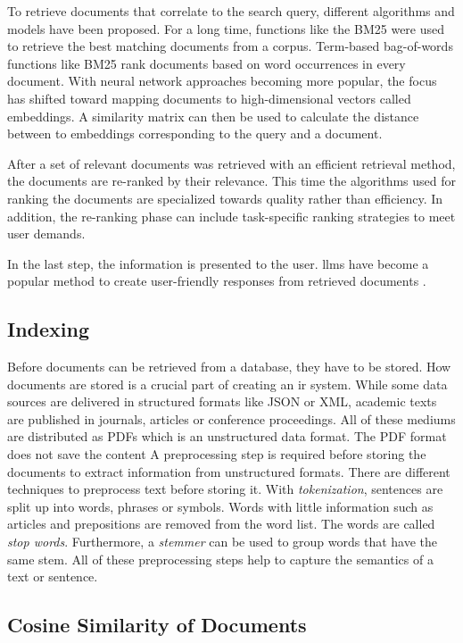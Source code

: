 \documentclass[../main.tex]{subfiles}
\begin{document}
To retrieve documents that correlate to the search query,
different algorithms and models have been proposed.
For a long time, functions like the BM25 \cite{Robertson2009}
were used to retrieve the best matching documents from a corpus.
Term-based bag-of-words functions like BM25 rank documents based on word occurrences in every document.
With neural network approaches becoming more popular,
the focus has shifted toward mapping documents to high-dimensional vectors called embeddings.
A similarity matrix can then be used to calculate the distance between to embeddings corresponding to the query and a document.

After a set of relevant documents was retrieved with an efficient retrieval method,
the documents are re-ranked by their relevance.
This time the algorithms used for ranking the documents are specialized towards quality rather than efficiency.
In addition, the re-ranking phase can include task-specific ranking strategies to meet user demands.

In the last step, the information is presented to the user.
\Glspl{llm} have become a popular method to create user-friendly responses from retrieved documents \cite{zotero-197}.

\subsection{Indexing}

Before documents can be retrieved from a database,
they have to be stored.
How documents are stored is a crucial part of creating an \gls{ir} system.
While some data sources are delivered in structured formats like JSON or XML,
academic texts are published in journals, articles or conference proceedings.
All of these mediums are distributed as PDFs which is an unstructured data format.
The PDF format does not save the content
A preprocessing step is required before storing the documents to extract information from unstructured formats.
There are different techniques to preprocess text before storing it.
With \emph{tokenization}, sentences are split up into words, phrases or symbols.
Words with little information such as articles and prepositions are removed from the word list.
The words are called \emph{stop words}.
Furthermore, a \emph{stemmer} can be used to group words that have the same stem.
All of these preprocessing steps help to capture the semantics of a text or sentence.

\subsection{Cosine Similarity of Documents}
\end{document}
